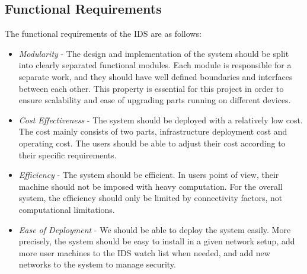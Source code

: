 \documentclass[conference]{sig-alternate-05-2015}
\begin{document}
\subsection{Functional Requirements}
The functional requirements of the IDS are as follows:
\begin{itemize}
\item \textit{Modularity} - The design and implementation of the system should be split into clearly separated functional modules. Each module is responsible for a separate work, and they should have well defined boundaries and interfaces between each other. This property is essential for this project in order to ensure scalability and ease of upgrading parts running on different devices. 
\item \textit{Cost Effectiveness} - The system should be deployed with a relatively low cost.  The cost mainly consists of two parts, infrastructure deployment cost and operating cost. The users should be able to adjust their cost according to their specific requirements. 
\item \textit{Efficiency} - The system should be efficient. In users point of view, their machine should not be imposed with heavy computation. For the overall system, the efficiency should only be limited by connectivity factors, not computational limitations. 
\item \textit{Ease of Deployment} - We should be able to deploy the system easily. More precisely, the system should be easy to install in a given network setup, add more user machines to the IDS watch list when needed, and add new networks to the system to manage security. 
\end{itemize}
\end{document}
